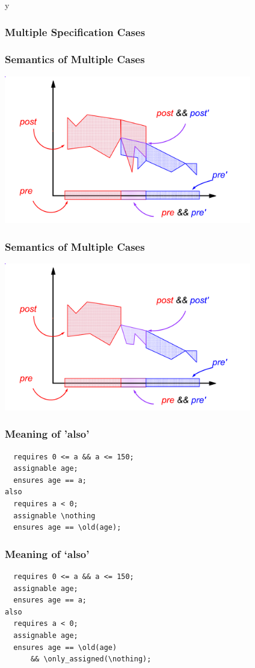 \if y\MAKEHANDOUTS \documentclass[t,compress,landscape,handout]{beamer}
\begin{document}
\begin{frame}
\frametitle{Multiple Specification Cases}

\end{frame}

\begin{frame}
\frametitle{Semantics of Multiple Cases}
\transdissolve[duration=0.5]
\includegraphics[width=4.25in]{join-both}
\end{frame}

\begin{frame}
\frametitle{Semantics of Multiple Cases}
\includegraphics[width=4.25in]{join-intersect}
\end{frame}

\begin{frame}[fragile]
\frametitle{Meaning of 'also'}
\begin{lstlisting}
  requires 0 <= a && a <= 150;
  assignable age;
  ensures age == a;
also
  requires a < 0;
  assignable \nothing
  ensures age == \old(age);
\end{lstlisting}
\end{frame}

\begin{frame}[fragile]
\frametitle{Meaning of `also'}
\begin{lstlisting}
  requires 0 <= a && a <= 150;
  assignable age;
  ensures age == a;
also
  requires a < 0;
  assignable age;
  ensures age == \old(age)
      && \only_assigned(\nothing);
\end{lstlisting}
\end{frame}
\end{document}
